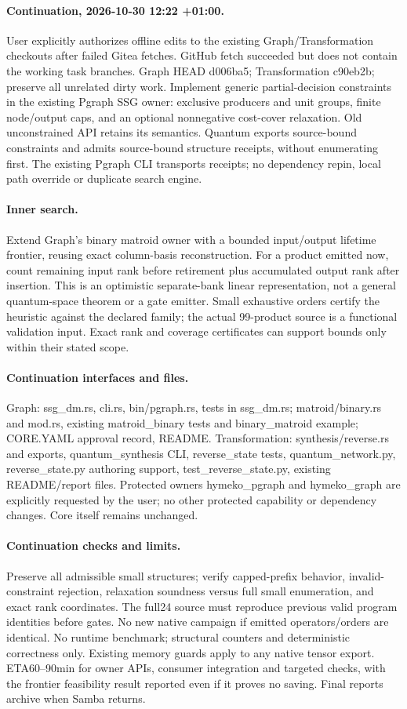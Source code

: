\documentclass{article}
\begin{document}
\paragraph{Continuation, 2026-10-30 12:22 +01:00.} User explicitly authorizes
offline edits to the existing Graph/Transformation checkouts after failed Gitea
fetches. GitHub fetch succeeded but does not contain the working task branches.
Graph HEAD d006ba5; Transformation c90eb2b; preserve all unrelated dirty work.
Implement generic partial-decision constraints in the existing Pgraph SSG owner:
exclusive producers and unit groups, finite node/output caps, and an optional
nonnegative cost-cover relaxation. Old unconstrained API retains its semantics.
Quantum exports source-bound constraints and admits source-bound structure
receipts, without enumerating first. The existing Pgraph CLI transports receipts;
no dependency repin, local path override or duplicate search engine.
\paragraph{Inner search.} Extend Graph's binary matroid owner with a bounded
input/output lifetime frontier, reusing exact column-basis reconstruction.
For a product emitted now, count remaining input rank before retirement plus
accumulated output rank after insertion. This is an optimistic separate-bank
linear representation, not a general quantum-space theorem or a gate emitter.
Small exhaustive orders certify the heuristic against the declared family;
the actual 99-product source is a functional validation input. Exact rank and
coverage certificates can support bounds only within their stated scope.
\paragraph{Continuation interfaces and files.} Graph: ssg\_dm.rs, cli.rs,
bin/pgraph.rs, tests in ssg\_dm.rs; matroid/binary.rs and mod.rs, existing
matroid\_binary tests and binary\_matroid example; CORE.YAML approval record,
README. Transformation: synthesis/reverse.rs and exports, quantum\_synthesis CLI,
reverse\_state tests, quantum\_network.py, reverse\_state.py authoring support,
test\_reverse\_state.py, existing README/report files. Protected owners
hymeko\_pgraph and hymeko\_graph are explicitly requested by the user; no other
protected capability or dependency changes. Core itself remains unchanged.
\paragraph{Continuation checks and limits.} Preserve all admissible small
structures; verify capped-prefix behavior, invalid-constraint rejection,
relaxation soundness versus full small enumeration, and exact rank coordinates.
The full24 source must reproduce previous valid program identities before gates.
No new native campaign if emitted operators/orders are identical. No runtime
benchmark; structural counters and deterministic correctness only. Existing
memory guards apply to any native tensor export. ETA60--90min for owner APIs,
consumer integration and targeted checks, with the frontier feasibility result
reported even if it proves no saving. Final reports archive when Samba returns.
\end{document}
